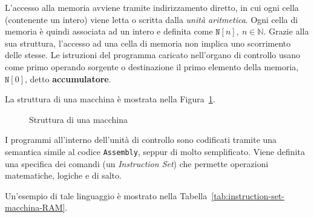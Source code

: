\documentclass[italian, 10pt]{article}
\begin{document}
L'accesso alla memoria avviene tramite indirizzamento diretto, in cui ogni cella (contenente un intero) viene letta o scritta dalla \textit{unità aritmetica}. Ogni cella di memoria è quindi associata ad un intero e definita come \(\texttt{N}[n],\ n \in \mathbb{N}\).
Grazie alla sua struttura, l'accesso ad una cella di memoria non implica uno scorrimento delle stesse.
Le istruzioni del programma caricato nell'organo di controllo usano come primo operando sorgente o destinazione il primo elemento della memoria, \(\texttt{N}[0]\), detto \textbf{accumulatore}.

\bigskip
La struttura di una macchina \RAM è mostrata nella Figura~\ref{fig:struttura-macchina-ram}.

\begin{figure}[htbp]
  \bigskip
  \centering
  \caption{Struttura di una macchina \RAM}
  \label{fig:struttura-macchina-ram}
  \bigskip
\end{figure}

\bigskip

I programmi all'interno dell'unità di controllo sono codificati tramite una semantica simile al codice \texttt{Assembly}, seppur di molto semplificato.
Viene definita una specifica dei comandi (un \textit{Instruction Set}) che permette operazioni matematiche, logiche e di salto.

Un'esempio di tale linguaggio è mostrato nella Tabella~\ref{tab:instruction-set-macchina-RAM}.
\end{document}
